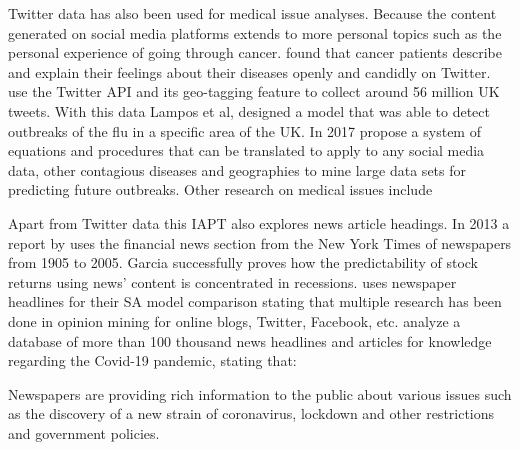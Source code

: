 Twitter data has also been used for medical issue analyses.
Because the content generated on social media platforms extends to more personal topics such as the personal experience of going through cancer.
\citet{Crannell2016} found that cancer patients describe and explain their feelings about their diseases openly and candidly on Twitter.
\citet{lampos2010flu} use the Twitter \ac{API} and its geo-tagging feature to collect around 56 million UK tweets.
With this data Lampos et al, designed a model that was able to detect outbreaks of the flu in a specific area of the UK\@.
In 2017 \citet{elkin2017network} propose a system of equations and procedures that can be translated to apply to any social media data, other contagious diseases and geographies to mine large data sets for predicting future outbreaks.
Other research on medical issues include~\citep{corley2010text, culotta2010towards, broniatowski2013national}

Apart from Twitter data this \ac{IAPT} also explores news article headings.
In 2013 a report by \citet{GarciaDiego2013SdR} uses the financial news section from the New York Times of newspapers from 1905 to 2005.
Garcia successfully proves how the predictability of stock returns using news' content is concentrated in recessions.
\citet{RameshbhaiChaudharyJashubhai2019Omon} uses newspaper headlines for their \ac{SA} model comparison stating that multiple research has been done in opinion mining for online blogs, Twitter, Facebook, etc.
\citet{GhasiyaPiyush2021ICNA} analyze a database of more than 100 thousand news headlines and articles for knowledge regarding the Covid-19 pandemic, stating that:
\begin{displayquote}
Newspapers are providing rich information to the public about various issues such as the discovery of a new strain of coronavirus, lockdown and other restrictions and government policies.
\end{displayquote}
